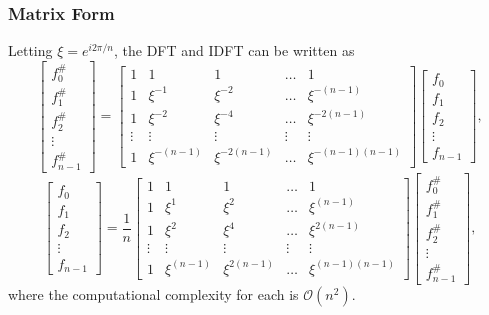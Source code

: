 \documentclass{beamer}
\begin{document}
\begin{frame}
	\frametitle{Matrix Form}
	Letting $\xi = e^{i2\pi/n}$, the DFT and IDFT can be written as
	\begin{equation*}
		\begin{bmatrix}
			f_{0}^{\#} \\
			f_{1}^{\#} \\
			f_{2}^{\#} \\
			\vdots \\
			f_{n-1}^{\#}
		\end{bmatrix}
		=
		\begin{bmatrix}
			1 & 1 & 1 & \dots & 1 \\
			1 & \xi^{-1} & \xi^{-2} & \dots & \xi^{-(n-1)} \\
			1 & \xi^{-2} & \xi^{-4} & \dots & \xi^{-2(n-1)} \\
			\vdots & \vdots & \vdots & \vdots & \vdots \\
			1 & \xi^{-(n-1)} & \xi^{-2(n-1)} & \dots & \xi^{-(n-1)(n-1)} 
		\end{bmatrix}
		\begin{bmatrix}
			f_{0} \\
			f_{1} \\
			f_{2} \\
			\vdots \\
			f_{n-1}
		\end{bmatrix},
	\end{equation*}
	\begin{equation*}
		\begin{bmatrix}
			f_{0} \\
			f_{1} \\
			f_{2} \\
			\vdots \\
			f_{n-1}
		\end{bmatrix}
		=
		\frac{1}{n}
		\begin{bmatrix}
			1 & 1 & 1 & \dots & 1 \\
			1 & \xi^{1} & \xi^{2} & \dots & \xi^{(n-1)} \\
			1 & \xi^{2} & \xi^{4} & \dots & \xi^{2(n-1)} \\
			\vdots & \vdots & \vdots & \vdots & \vdots \\
			1 & \xi^{(n-1)} & \xi^{2(n-1)} & \dots & \xi^{(n-1)(n-1)} 
		\end{bmatrix}
		\begin{bmatrix}
			f_{0}^{\#} \\
			f_{1}^{\#} \\
			f_{2}^{\#} \\
			\vdots \\
			f_{n-1}^{\#}
		\end{bmatrix},
	\end{equation*}
	where the computational complexity for each is $\mathcal{O}(n^2)$.
\end{frame}
\end{document}

